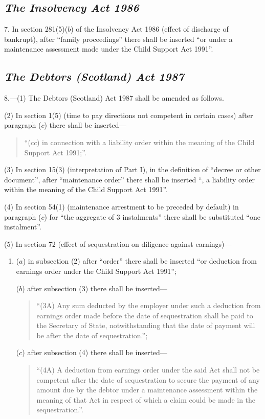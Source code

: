 \documentclass[12pt,a4paper]{article}
\begin{document}
\subsection*{\itshape The Insolvency Act 1986}

7. In section 281(5)($b$)  of the Insolvency Act 1986 (effect of discharge of bankrupt), after “family proceedings” there shall be inserted “or under a maintenance assessment made under the Child Support Act 1991”.

\subsection*{\itshape The Debtors (Scotland) Act 1987}

8.---(1) The Debtors (Scotland) Act 1987 shall be amended as follows.

(2) In section 1(5)  (time to pay directions not competent in certain cases) after paragraph ($c$)  there shall be inserted—
\begin{quotation}
“($cc$) in connection with a liability order within the meaning of the Child Support Act 1991;”.
\end{quotation}

(3) In section 15(3)  (interpretation of Part I), in the definition of “decree or other document”, after “maintenance order” there shall be inserted “, a liability order within the meaning of the Child Support Act 1991”.

(4) In section 54(1)  (maintenance arrestment to be preceded by default) in paragraph ($c$)  for “the aggregate of 3 instalments” there shall be substituted “one instalment”.

(5) In section 72 (effect of sequestration on diligence against earnings)—
\begin{enumerate}\item[]
($a$) in subsection (2)  after “order” there shall be inserted “or deduction from earnings order under the Child Support Act 1991”;

($b$) after subsection (3)  there shall be inserted—
\begin{quotation}
“(3A) Any sum deducted by the employer under such a deduction from earnings order made before the date of sequestration shall be paid to the Secretary of State, notwithstanding that the date of payment will be after the date of sequestration.”;
\end{quotation}

($c$) after subsection (4)  there shall be inserted—
\begin{quotation}
“(4A) A deduction from earnings order under the said Act shall not be competent after the date of sequestration to secure the payment of any amount due by the debtor under a maintenance assessment within the meaning of that Act in respect of which a claim could be made in the sequestration.”.
\end{quotation}
\end{enumerate}
\end{document}
